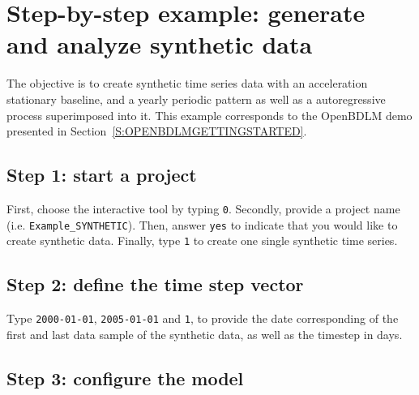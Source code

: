 \section{Step-by-step example: generate and analyze synthetic data }
\label{S:EXAMPLESYNTHETICDATA}


The objective is to create synthetic time series data with an acceleration stationary baseline, and a yearly periodic pattern as well as a autoregressive process superimposed into it. 
This example corresponds to the OpenBDLM demo presented in Section~\ref{S:OPENBDLMGETTINGSTARTED}.

\subsection{Step 1: start a project}

First, choose the interactive tool by typing \colorbox{light-gray}{\lstinline[basicstyle = \mlttfamily \small, backgroundcolor = \color{light-gray}]!0!}.
Secondly, provide a project name (i.e. \lstinline[basicstyle = \mlttfamily \small, backgroundcolor = \color{light-gray}]!Example_SYNTHETIC!).
Then, answer \colorbox{light-gray}{\lstinline[basicstyle = \mlttfamily \small, backgroundcolor = \color{light-gray}]!yes!} to indicate that you would like to create synthetic data.
Finally, type \colorbox{light-gray}{\lstinline[basicstyle = \mlttfamily \small, backgroundcolor = \color{light-gray}]!1!} to create one single synthetic time series. 

\subsection{Step 2: define the time step vector}

Type \colorbox{light-gray}{\lstinline[basicstyle = \mlttfamily \small, backgroundcolor = \color{light-gray}]!2000-01-01!}, \colorbox{light-gray}{\lstinline[basicstyle = \mlttfamily \small, backgroundcolor = \color{light-gray}]!2005-01-01!} and \colorbox{light-gray}{\lstinline[basicstyle = \mlttfamily \small, backgroundcolor = \color{light-gray}]!1!}, to provide the date corresponding of the first and last data sample of the synthetic data, as well as the timestep in days.


\subsection{Step 3: configure the model}

